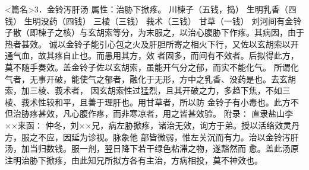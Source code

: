 \documentclass[a4paper,12pt,UTF8,twoside]{ctexbook}
\begin{document}
<篇名>3．金铃泻肝汤
属性：治胁下掀疼。 
川楝子（五钱，捣） 生明乳香（四钱） 生明没药（四钱） 三棱（三钱） 莪术（三钱） 甘草（一钱） 
刘河间有金铃子散（即楝子之核）与玄胡索等分，为末服之，以治心腹胁下作疼。其病因，由于热者甚效。 
诚以金铃子能引心包之火及肝胆所寄之相火下行，又佐以玄胡索以开通气血，故其疼自止也。而愚用其方，效 
者固多，而间有不效者。后拟得此方，莫不随手奏效。盖金铃子佐以玄胡索，虽能开气分之郁，而实不能化气。 
所谓化气者，无事开破，能使气之郁者，融化于无形，方中之乳香、没药是也。去玄胡索，加三棱、莪术者， 
因玄胡索性过猛烈，且其开破之力，多趋下焦，不如三棱、莪术性较和平，且善于理肝也。用甘草者，所以防 
金铃子有小毒也。此方不但治胁疼甚效，凡心腹作疼，而非寒凉者，用之皆甚效验。 
附录∶ 
直隶盐山李××来函∶ 
仲冬，刘××兄，病左胁掀疼，诸治无效，询方于弟。授以活络效灵丹方，服之不应，因延为诊视。脉象他 
部皆微弱，惟左关沉而有力。治以金铃泻肝汤，加当归数钱。服一剂，翌日降下若干绿色粘滞之物，遂豁然而 
愈。盖此汤原注明治胁下掀疼，由此知兄所拟方各有主治，方病相投，莫不神效也。 
\end{document}
